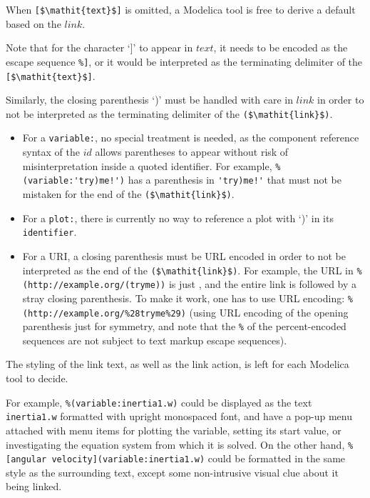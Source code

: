 When \lstinline![$\mathit{text}$]! is omitted, a Modelica tool is free to derive a default based on the $\mathit{link}$.

\begin{nonnormative}
Note that for the character `]' to appear in $\mathit{text}$, it needs to be encoded as the escape sequence \lstinline!%]!, or it would be interpreted as the terminating delimiter of the \lstinline![$\mathit{text}$]!.

Similarly, the closing parenthesis `)' must be handled with care in $\mathit{link}$ in order to not be interpreted as the terminating delimiter of the \lstinline!($\mathit{link}$)!.
\begin{itemize}
\item
For a \lstinline!variable:!, no special treatment is needed, as the component reference syntax of the $\mathit{id}$ allows parentheses to appear without risk of misinterpretation inside a quoted identifier.
For example, \lstinline"%(variable:'try)me!')" has a parenthesis in \lstinline"'try)me!'" that must not be mistaken for the end of the \lstinline!($\mathit{link}$)!.
\item
For a \lstinline!plot:!, there is currently no way to reference a plot with `)' in its \lstinline!identifier!.
\item
For a URI, a closing parenthesis must be URL encoded in order to not be interpreted as the end of the \lstinline!($\mathit{link}$)!.
For example, the URL in \lstinline[language={[nocomment]modelica}]!%
To make it work, one has to use URL encoding: \lstinline[language={[nocomment]modelica}]!%
\end{itemize}
\end{nonnormative}

The styling of the link text, as well as the link action, is left for each Modelica tool to decide.

\begin{nonnormative}
For example, \lstinline!%(variable:inertia1.w)! could be displayed as the text \lstinline!inertia1.w! formatted with upright monospaced font, and have a pop-up menu attached with menu items for plotting the variable, setting its start value, or investigating the equation system from which it is solved.
On the other hand, \lstinline!%[angular velocity](variable:inertia1.w)! could be formatted in the same style as the surrounding text, except some non-intrusive visual clue about it being linked.
\end{nonnormative}

